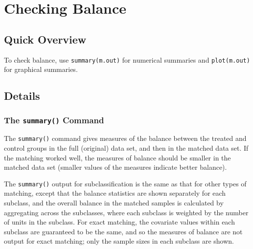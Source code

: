 \section{Checking Balance}
\label{sec:balance}

\subsection{Quick Overview}

To check balance, use \texttt{summary(m.out)} for numerical summaries
and \texttt{plot(m.out)} for graphical summaries.

\subsection{Details}

\subsubsection{The {\tt summary()} Command}

The \texttt{summary()} command gives measures of the balance between
the treated and control groups in the full (original) data set, and
then in the matched data set.  If the matching worked well, the
measures of balance should be smaller in the matched data set (smaller
values of the measures indicate better balance).

The \texttt{summary()} output for subclassification is the same as
that for other types of matching, except that the balance statistics
are shown separately for each subclass, and the overall balance in the
matched samples is calculated by aggregating across the subclasses,
where each subclass is weighted by the number of units in the
subclass.  For exact matching, the covariate values within each
subclass are guaranteed to be the same, and so the measures of balance
are not output for exact matching; only the sample sizes in each
subclass are shown.

